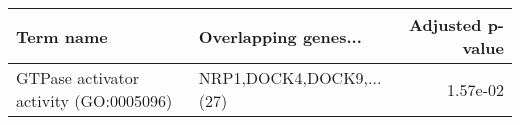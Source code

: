 \begin{tabular}{llr}
\toprule
                             Term name &     Overlapping genes... &  Adjusted p-value \\
\midrule
GTPase activator activity (GO:0005096) & NRP1,DOCK4,DOCK9,...(27) &          1.57e-02 \\
\bottomrule
\end{tabular}

